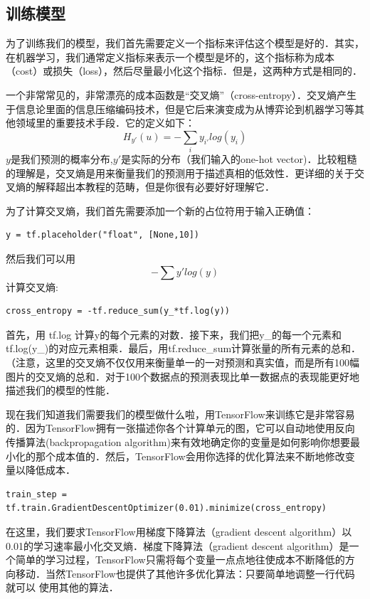 \subsection{训练模型}
为了训练我们的模型，我们首先需要定义一个指标来评估这个模型是好的．其实，在机器学习，我们通常定义指标来表示一个模型是坏的，这个指标称为成本（cost）或损失（loss），然后尽量最小化这个指标．但是，这两种方式是相同的．

一个非常常见的，非常漂亮的成本函数是“交叉熵”（cross-entropy）．交叉熵产生于信息论里面的信息压缩编码技术，但是它后来演变成为从博弈论到机器学习等其他领域里的重要技术手段．它的定义如下：
\begin{equation}
H_{y'}(u) = -\sum_i{y_{i'}log(y_i)}
\end{equation}
$y$是我们预测的概率分布,$y'$是实际的分布（我们输入的one-hot vector)．比较粗糙的理解是，交叉熵是用来衡量我们的预测用于描述真相的低效性．更详细的关于交叉熵的解释超出本教程的范畴，但是你很有必要好好理解它．

为了计算交叉熵，我们首先需要添加一个新的占位符用于输入正确值：
\begin{lstlisting}
y = tf.placeholder("float", [None,10])
\end{lstlisting}
然后我们可以用
\begin{equation}
-\sum{y'log(y)}
\end{equation}
计算交叉熵:

\begin{lstlisting}
cross_entropy = -tf.reduce_sum(y_*tf.log(y))
\end{lstlisting}

首先，用 tf.log 计算y的每个元素的对数．接下来，我们把y\_的每一个元素和tf.log(y\_)的对应元素相乘．最后，用tf.reduce\_sum计算张量的所有元素的总和．（注意，这里的交叉熵不仅仅用来衡量单一的一对预测和真实值，而是所有100幅图片的交叉熵的总和．对于100个数据点的预测表现比单一数据点的表现能更好地描述我们的模型的性能．

现在我们知道我们需要我们的模型做什么啦，用TensorFlow来训练它是非常容易的．因为TensorFlow拥有一张描述你各个计算单元的图，它可以自动地使用反向传播算法(backpropagation algorithm)来有效地确定你的变量是如何影响你想要最小化的那个成本值的．然后，TensorFlow会用你选择的优化算法来不断地修改变量以降低成本．

\begin{lstlisting}
train_step = tf.train.GradientDescentOptimizer(0.01).minimize(cross_entropy)
\end{lstlisting}

在这里，我们要求TensorFlow用梯度下降算法（gradient descent algorithm）以0.01的学习速率最小化交叉熵．梯度下降算法（gradient descent algorithm）是一个简单的学习过程，TensorFlow只需将每个变量一点点地往使成本不断降低的方向移动．当然TensorFlow也提供了其他许多优化算法：只要简单地调整一行代码就可以
使用其他的算法．

